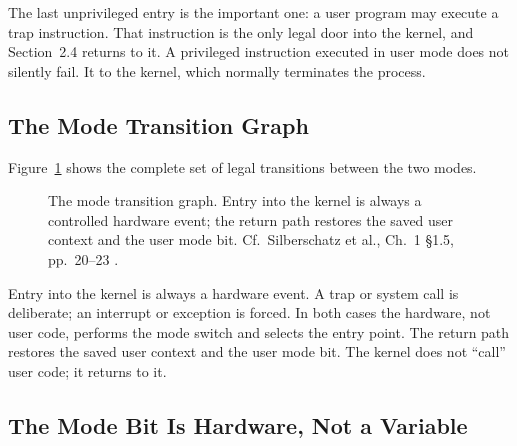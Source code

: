 \documentclass[11pt]{article}
\begin{document}
The last unprivileged entry is the important one: a user program may execute a
trap instruction. That instruction is the only legal door into the kernel, and
Section~2.4 returns to it. A privileged instruction executed in user mode does
not silently fail. It  to the kernel, which normally terminates the
process.

\subsection{The Mode Transition Graph}

Figure~\ref{fig:mode-graph} shows the complete set of legal transitions between
the two modes.

\begin{figure}[h]
  \centering
  \caption{The mode transition graph. Entry into the kernel is always a
  controlled hardware event; the return path restores the saved user context
  and the user mode bit. Cf.\ Silberschatz et al., Ch.~1 \S1.5, pp.~20--23
  \cite{SilberschatzOSC_operating_system_concepts}.}
  \label{fig:mode-graph}
\end{figure}

Entry into the kernel is always a  hardware event. A trap or
system call is deliberate; an interrupt or exception is forced. In both cases
the hardware, not user code, performs the mode switch and selects the entry
point. The return path restores the saved user context and the user mode bit.
The kernel does not ``call'' user code; it returns to it.

\subsection{The Mode Bit Is Hardware, Not a Variable}
\end{document}
